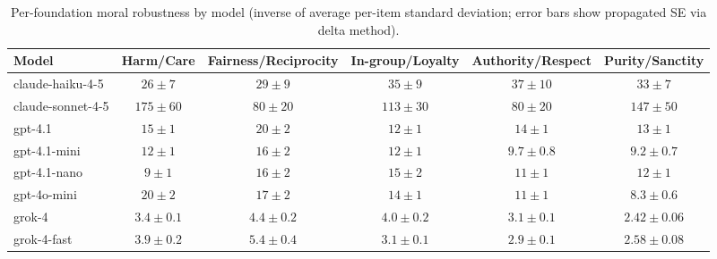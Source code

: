 \begin{table*}[t]
  \centering
  \caption{Per-foundation moral robustness by model (inverse of average per-item standard deviation; error bars show propagated SE via delta method).}
  \label{tab:robustness_by_foundation}
  \begin{tabular}{lccccc}
    \toprule
    Model & Harm/Care & Fairness/Reciprocity & In-group/Loyalty & Authority/Respect & Purity/Sanctity \\
    \midrule
    claude-haiku-4-5 & $26\pm 7$ & $29\pm 9$ & $35\pm 9$ & $37\pm 10$ & $33\pm 7$ \\
    claude-sonnet-4-5 & $175\pm 60$ & $80\pm 20$ & $113\pm 30$ & $80\pm 20$ & $147\pm 50$ \\
    gpt-4.1 & $15\pm 1$ & $20\pm 2$ & $12\pm 1$ & $14\pm 1$ & $13\pm 1$ \\
    gpt-4.1-mini & $12\pm 1$ & $16\pm 2$ & $12\pm 1$ & $9.7\pm 0.8$ & $9.2\pm 0.7$ \\
    gpt-4.1-nano & $9\pm 1$ & $16\pm 2$ & $15\pm 2$ & $11\pm 1$ & $12\pm 1$ \\
    gpt-4o-mini & $20\pm 2$ & $17\pm 2$ & $14\pm 1$ & $11\pm 1$ & $8.3\pm 0.6$ \\
    grok-4 & $3.4\pm 0.1$ & $4.4\pm 0.2$ & $4.0\pm 0.2$ & $3.1\pm 0.1$ & $2.42\pm 0.06$ \\
    grok-4-fast & $3.9\pm 0.2$ & $5.4\pm 0.4$ & $3.1\pm 0.1$ & $2.9\pm 0.1$ & $2.58\pm 0.08$ \\
    \bottomrule
  \end{tabular}
\end{table*}

